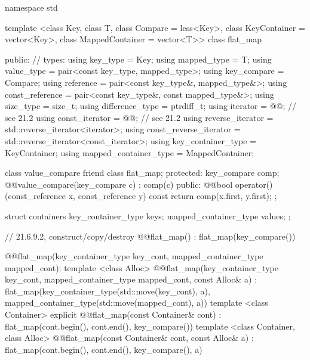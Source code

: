 \begin{codeblock}
namespace std {
  template <class Key, class T, class Compare = less<Key>,
            class KeyContainer = vector<Key>,
            class MappedContainer = vector<T>>
  class flat_map {
  public:
    // types:
    using key_type                  = Key;
    using mapped_type               = T;
    using value_type                = pair<const key_type, mapped_type>;
    using key_compare               = Compare;
    using reference                 = pair<const key_type&, mapped_type&>;
    using const_reference           = pair<const key_type&, const mapped_type&>;
    using size_type                 = size_t;
    using difference_type           = ptrdiff_t;
    using iterator                  = @@; // see 21.2
    using const_iterator            = @@; // see 21.2
    using reverse_iterator          = std::reverse_iterator<iterator>;
    using const_reverse_iterator    = std::reverse_iterator<const_iterator>;
    using key_container_type        = KeyContainer;
    using mapped_container_type     = MappedContainer;

    class value_compare {
      friend class flat_map;
    protected:
      key_compare comp;
      @@value_compare(key_compare c) : comp(c) { }
    public:
      @@bool operator()(const_reference x, const_reference y) const {
        return comp(x.first, y.first);
      }
    };

    struct containers
    {
      key_container_type keys;
      mapped_container_type values;
    };

    // 21.6.9.2, construct/copy/destroy
    @@flat_map() : flat_map(key_compare()) { }

    @@flat_map(key_container_type key_cont, mapped_container_type mapped_cont);
    template <class Alloc>
    @@flat_map(key_container_type key_cont, mapped_container_type mapped_cont,
                       const Alloc& a)
        : flat_map(key_container_type(std::move(key_cont), a),
                   mapped_container_type(std::move(mapped_cont), a))
      { }
    template <class Container>
      explicit @@flat_map(const Container& cont)
        : flat_map(cont.begin(), cont.end(), key_compare()) { }
    template <class Container, class Alloc>
      @@flat_map(const Container& cont, const Alloc& a)
        : flat_map(cont.begin(), cont.end(), key_compare(), a) { }

}}
\end{codeblock}

